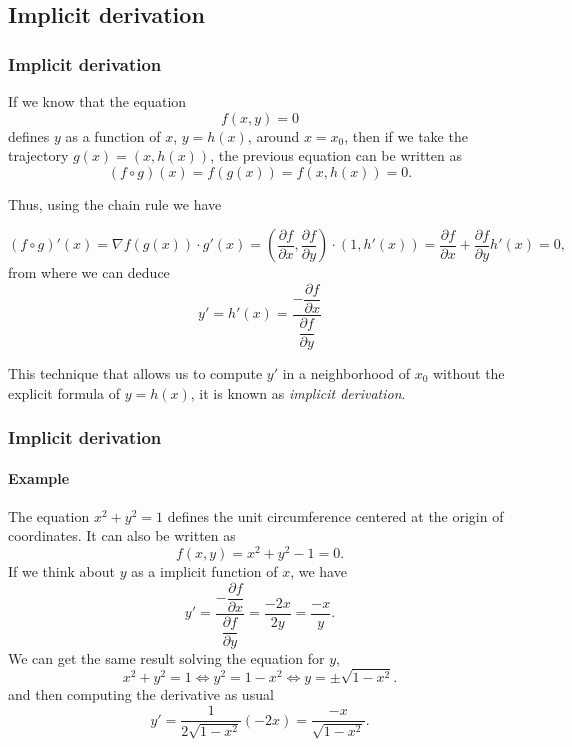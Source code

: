 \subsection{Implicit derivation}
\begin{frame}
\frametitle{Implicit derivation}
If we know that the equation
\[
f(x,y)=0
\]
defines $y$ as a function of $x$, $y=h(x)$, around $x=x_0$, then if we take the trajectory $g(x)=(x,h(x))$, the previous equation can be written as
\[
(f\circ g)(x) = f(g(x)) = f(x,h(x))=0.
\]

Thus, using the chain rule we have

\[
(f\circ g)'(x) = \nabla f(g(x))\cdot g'(x) = \left(\frac{\partial f}{\partial x}, \frac{\partial f}{\partial y}\right)\cdot (1,h'(x)) =
\frac{\partial f}{\partial x}+\frac{\partial f}{\partial y}h'(x) = 0,
\]
from where we can deduce
\[
y'=h'(x)=\frac{-\dfrac{\partial f}{\partial x}}{\dfrac{\partial f}{\partial y}}
\]

This technique that allows us to compute $y'$ in a neighborhood of $x_0$ without the explicit formula of $y=h(x)$, it is known as \emph{implicit derivation}.
\end{frame}


\begin{frame}
\frametitle{Implicit derivation}
\framesubtitle{Example}
The equation $x^2+y^2=1$ defines the unit circumference centered at the origin of coordinates. 
It can also be written as
\[
f(x,y) = x^2+y^2-1 = 0.
\]
If we think about $y$ as a implicit function of $x$, we have
\[
y'=\frac{-\dfrac{\partial f}{\partial x}}{\dfrac{\partial f}{\partial y}} = \frac{-2x}{2y}=\frac{-x}{y}.
\]
We can get the same result solving the equation for $y$,
\[
x^2+y^2=1 \Leftrightarrow y^2=1-x^2 \Leftrightarrow y= \pm\sqrt{1-x^2}.
\]
and then computing the derivative as usual
\[
y' = \frac{1}{2\sqrt{1-x^2}}(-2x) = \frac{-x}{\sqrt{1-x^2}}.
\]
\end{frame}


